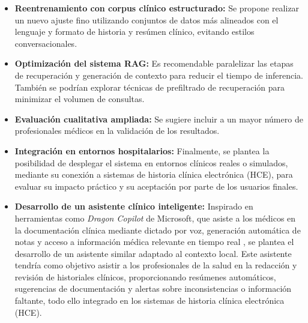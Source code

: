 \documentclass[../main.tex]{subfiles}
\begin{document}
\begin{itemize}
	\item \textbf{Reentrenamiento con corpus clínico estructurado:} Se propone realizar un nuevo ajuste fino utilizando conjuntos de datos más alineados con el lenguaje y formato de historia y resúmen clínico, evitando estilos conversacionales.
	
	\item \textbf{Optimización del sistema RAG:} Es recomendable paralelizar las etapas de recuperación y generación de contexto para reducir el tiempo de inferencia. También se podrían explorar técnicas de prefiltrado de recuperación para minimizar el volumen de consultas.
	
	\item \textbf{Evaluación cualitativa ampliada:} Se sugiere incluir a un mayor número de profesionales médicos en la validación de los resultados.
	
	\item \textbf{Integración en entornos hospitalarios:} Finalmente, se plantea la posibilidad de desplegar el sistema en entornos clínicos reales o simulados, mediante su conexión a sistemas de historia clínica electrónica (HCE), para evaluar su impacto práctico y su aceptación por parte de los usuarios finales.
	
	\item \textbf{Desarrollo de un asistente clínico inteligente:} Inspirado en herramientas como \textit{Dragon Copilot} de Microsoft, que asiste a los médicos en la documentación clínica mediante dictado por voz, generación automática de notas y acceso a información médica relevante en tiempo real \parencite{microsoft_dragon_copilot}, se plantea el desarrollo de un asistente similar adaptado al contexto local. Este asistente tendría como objetivo asistir a los profesionales de la salud en la redacción y revisión de historiales clínicos, proporcionando resúmenes automáticos, sugerencias de documentación y alertas sobre inconsistencias o información faltante, todo ello integrado en los sistemas de historia clínica electrónica (HCE).
	

	

\end{itemize}
\end{document}
